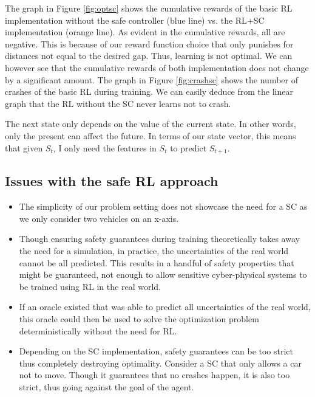 The graph in Figure \ref{fig:optsc} shows the cumulative rewards of the basic RL implementation without
the safe controller (blue line) vs. the RL+SC implementation (orange line). As evident in the cumulative rewards, all are negative. This is because of our reward function choice 
that only punishes for distances not equal to the desired gap. Thus, learning is not optimal. We can however see that the cumulative rewards of both implementation does not change by a significant 
amount. The graph in Figure \ref{fig:crashsc} shows 
the number of crashes of the basic RL during training. We can easily deduce from the linear graph that the RL without the SC never learns not to crash.


\begin{definition}
  The next state only depends on the value of the current state. In other words, only the present can affect the future. 
  In terms of our state vector, this means that given $S_t$, I only need the features in $S_t$ to predict $S_{t+1}$.
\end{definition}

\subsection{Issues with the safe RL approach}
\begin{itemize}
  \item The simplicity of our problem setting does not showcase the need for a SC as we only consider two vehicles on an x-axis. 
  \item Though ensuring safety guarantees during training theoretically takes away the need for a simulation, in practice, the uncertainties 
        of the real world cannot be all predicted. This results in a handful of safety properties that might be guaranteed, not enough to allow sensitive cyber-physical systems 
        to be trained using RL in the real world. 
  \item If an oracle existed that was able to predict all uncertainties of the real world, this oracle could then be used to solve the optimization problem 
        deterministically without the need for RL. 
  \item Depending on the SC implementation, safety guarantees can be too strict thus completely destroying optimality. Consider a SC that only allows a car not to move. 
        Though it guarantees that no crashes happen, it is also too strict, thus going against the goal of the agent. 
  
\end{itemize}


